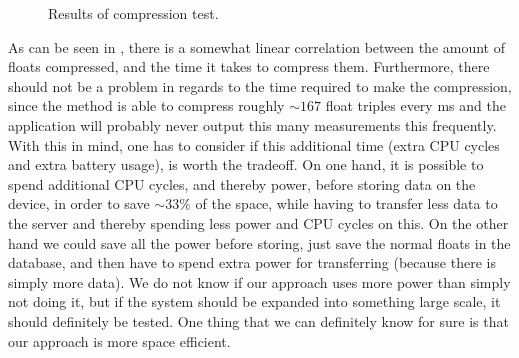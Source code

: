 \begin{figure}[!htbp]
    \centering


    \caption{Results of compression test.}
    \label{fig:result_of_compression_test}
\end{figure}
\FloatBarrier

As can be seen in , there is a somewhat linear correlation between the amount of floats compressed, and the time it takes to compress them. Furthermore, there should not be a problem in regards to the time required to make the compression, since the method is able to compress roughly $\sim 167$ float triples every ms and the application will probably never output this many measurements this frequently. With this in mind, one has to consider if this additional time (extra CPU cycles and extra battery usage), is worth the tradeoff. On one hand, it is possible to spend additional CPU cycles, and thereby power, before storing data on the device, in order to save $\sim 33\%$ of the space, while having to transfer less data to the server and thereby spending less power and CPU cycles on this. On the other hand we could save all the power before storing, just save the normal floats in the database, and then have to spend extra power for transferring (because there is simply more data). We do not know if our approach uses more power than simply not doing it, but if the system should be expanded into something large scale, it should definitely be tested. One thing that we can definitely know for sure is that our approach is more space efficient. 

